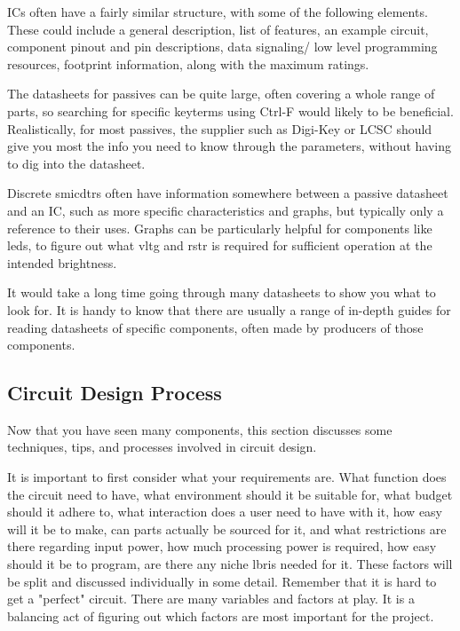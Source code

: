 \documentclass[a4paper,11pt]{report}
\begin{document}
ICs often have a fairly similar structure, with some of the following elements. These could include a general description, list of features, an example circuit, component pinout and pin descriptions, data signaling/ low level programming resources, footprint information, along with the maximum ratings.

The datasheets for passives can be quite large, often covering a whole range of parts, so searching for specific keyterms using Ctrl-F would likely to be beneficial. Realistically, for most passives, the supplier such as Digi-Key or LCSC should give you most the info you need to know through the parameters, without having to dig into the datasheet.

Discrete \gls{smicdtr}s often have information somewhere between a passive datasheet and an IC, such as more specific characteristics and graphs, but typically only a reference to their uses. Graphs can be particularly helpful for components like \gls{led}s, to figure out what \gls{vltg} and \gls{rstr} is required for sufficient operation at the intended brightness.

It would take a long time going through many datasheets to show you what to look for. It is handy to know that there are usually a range of in-depth guides for reading datasheets of specific components, often made by producers of those components.

\vspace*{1\baselineskip}

\subsection{Circuit Design Process}

Now that you have seen many components, this section discusses some techniques, tips, and processes involved in circuit design.

It is important to first consider what your requirements are. What function does the circuit need to have, what environment should it be suitable for, what budget should it adhere to, what interaction does a user need to have with it, how easy will it be to make, can parts actually be sourced for it, and what restrictions are there regarding input power, how much processing power is required, how easy should it be to program, are there any niche \gls{lbris} needed for it. These factors will be split and discussed individually in some detail. Remember that it is hard to get a "perfect" circuit. There are many variables and factors at play. It is a balancing act of figuring out which factors are most important for the project.
\end{document}
